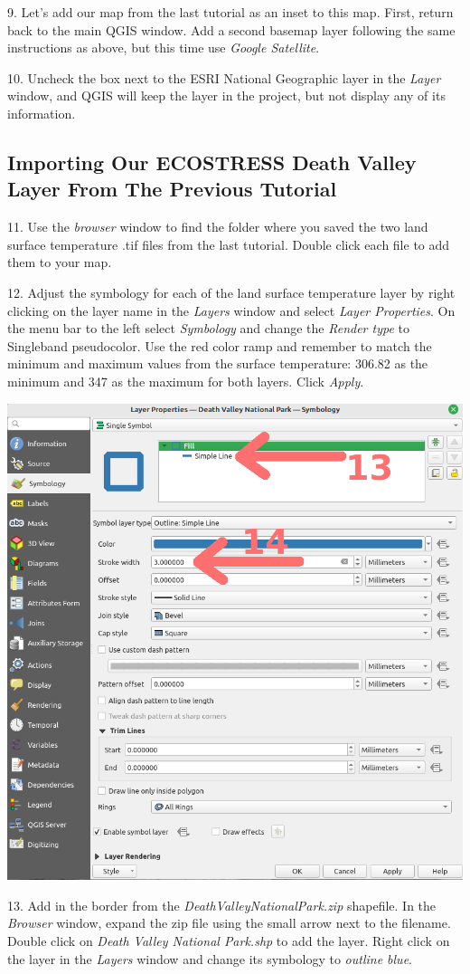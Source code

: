 \documentclass[oneside,a4paper,11pt,explicit]{book}
\begin{document}
9. Let's add our map from the last tutorial as an inset to this map. First, return back to the main QGIS window. Add a second basemap layer following the same instructions as above, but this time use \textit{Google Satellite}.

10. Uncheck the box next to the ESRI National Geographic layer in the \emph{Layer} window, and QGIS will keep the layer in the project, but not display any of its information.

\subsection{Importing Our ECOSTRESS Death Valley Layer From The Previous Tutorial}
11. Use the \textit{browser} window to find the folder where you saved the two land surface temperature .tif files from the last tutorial. Double click each file to add them to your map.

12. Adjust the symbology for each of the land surface temperature layer by right clicking on the layer name in the \textit{Layers} window and select \textit{Layer Properties}. On the menu bar to the left select \textit{Symbology} and change the \textit{Render type} to Singleband pseudocolor. Use the red color ramp and remember to match the minimum and maximum values from the surface temperature: 306.82 as the minimum and 347 as the maximum for both layers. Click \textit{Apply}.

\centerline{\includegraphics[width=.625\textwidth]{DVlines.png}}

13. Add in the border from the \textit{DeathValleyNationalPark.zip} shapefile. In the \textit{Browser} window, expand the zip file using the small arrow next to the filename. Double click on \textit{Death Valley National Park.shp} to add the layer. Right click on the layer in the \textit{Layers} window and change its symbology to \textit{outline blue}. 
\end{document}
